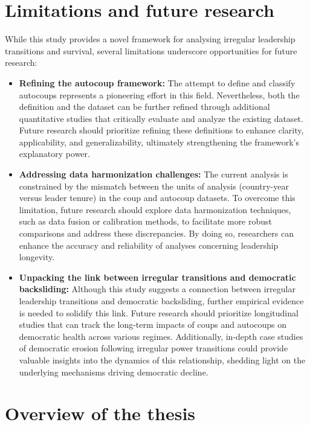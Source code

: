 \documentclass[
  12pt,
]{report}
\begin{document}
\section{Limitations and future
research}\label{limitations-and-future-research}

While this study provides a novel framework for analysing irregular
leadership transitions and survival, several limitations underscore
opportunities for future research:

\begin{itemize}
\item
  \textbf{Refining the autocoup framework:} The attempt to define and
  classify autocoups represents a pioneering effort in this field.
  Nevertheless, both the definition and the dataset can be further
  refined through additional quantitative studies that critically
  evaluate and analyze the existing dataset. Future research should
  prioritize refining these definitions to enhance clarity,
  applicability, and generalizability, ultimately strengthening the
  framework's explanatory power.
\item
  \textbf{Addressing data harmonization challenges:} The current
  analysis is constrained by the mismatch between the units of analysis
  (country-year versus leader tenure) in the coup and autocoup datasets.
  To overcome this limitation, future research should explore data
  harmonization techniques, such as data fusion or calibration methods,
  to facilitate more robust comparisons and address these discrepancies.
  By doing so, researchers can enhance the accuracy and reliability of
  analyses concerning leadership longevity.
\item
  \textbf{Unpacking the link between irregular transitions and
  democratic backsliding:} Although this study suggests a connection
  between irregular leadership transitions and democratic backsliding,
  further empirical evidence is needed to solidify this link. Future
  research should prioritize longitudinal studies that can track the
  long-term impacts of coups and autocoups on democratic health across
  various regimes. Additionally, in-depth case studies of democratic
  erosion following irregular power transitions could provide valuable
  insights into the dynamics of this relationship, shedding light on the
  underlying mechanisms driving democratic decline.
\end{itemize}

\section{Overview of the thesis}\label{overview-of-the-thesis}
\end{document}
